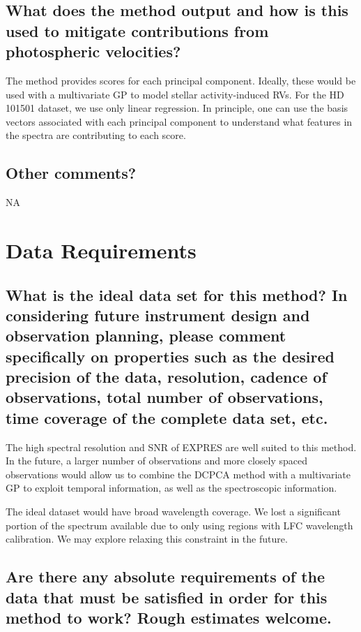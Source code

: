 \documentclass[12pt]{article}
\begin{document}
\subsection{What does the method output and how is this used to mitigate contributions from photospheric velocities?}
The method provides scores for each principal component.  Ideally, these would be used with a multivariate GP to model stellar activity-induced RVs.  For the HD 101501 dataset, we use only linear regression.
In principle, one can use the basis vectors associated with each principal component to understand what features in the spectra are contributing to each score.

\subsection{Other comments?}

NA

\section{Data Requirements}
\subsection{What is the ideal data set for this method?  In considering future instrument design and observation planning, please comment specifically on properties such as the desired precision of the data, resolution, cadence of observations, total number of observations, time coverage of the complete data set, etc.}

The high spectral resolution and SNR of EXPRES are well suited to this method.  In the future, a larger number of observations and more closely spaced observations would allow us to combine the DCPCA method with a multivariate GP to exploit temporal information, as well as the spectroscopic information.

The ideal dataset would have broad wavelength coverage.
We lost a significant portion of the spectrum available due to only using regions with LFC wavelength calibration.
We may explore relaxing this constraint in the future.

\subsection{Are there any absolute requirements of the data that must be satisfied in order for this method to work?  Rough estimates welcome.}
\end{document}
